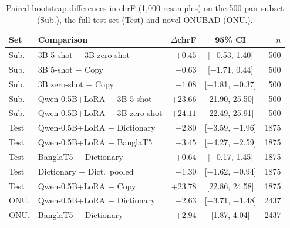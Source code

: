 \begin{table}[t]\centering\small
\begin{tabular}{@{}llrcr@{}}\toprule
Set & Comparison & $\Delta$chrF & 95\% CI & $n$\\\midrule
Sub. & 3B 5-shot $-$ 3B zero-shot & $+0.45$ & [$-$0.53, 1.40] & 500\\
Sub. & 3B 5-shot $-$ Copy & $-0.63$ & [$-$1.71, 0.44] & 500\\
Sub. & 3B zero-shot $-$ Copy & $-1.08$ & [$-$1.81, $-$0.37] & 500\\
Sub. & Qwen-0.5B+LoRA $-$ 3B 5-shot & $+23.66$ & [21.90, 25.50] & 500\\
Sub. & Qwen-0.5B+LoRA $-$ 3B zero-shot & $+24.11$ & [22.49, 25.91] & 500\\
\addlinespace[2pt]
Test & Qwen-0.5B+LoRA $-$ Dictionary & $-2.80$ & [$-$3.59, $-$1.96] & 1875\\
Test & Qwen-0.5B+LoRA $-$ BanglaT5 & $-3.45$ & [$-$4.27, $-$2.59] & 1875\\
Test & BanglaT5 $-$ Dictionary & $+0.64$ & [$-$0.17, 1.45] & 1875\\
Test & Dictionary $-$ Dict.\ pooled & $-1.30$ & [$-$1.62, $-$0.94] & 1875\\
Test & Qwen-0.5B+LoRA $-$ Copy & $+23.78$ & [22.86, 24.58] & 1875\\
\addlinespace[2pt]
ONU. & Qwen-0.5B+LoRA $-$ Dictionary & $-2.63$ & [$-$3.71, $-$1.48] & 2437\\
ONU. & BanglaT5 $-$ Dictionary & $+2.94$ & [1.87, 4.04] & 2437\\
\bottomrule\end{tabular}
\caption{Paired bootstrap differences in chrF (1,000 resamples) on the 500-pair subset (Sub.), the full test set (Test) and novel ONUBAD (ONU.).}\label{tab:sig}
\end{table}
